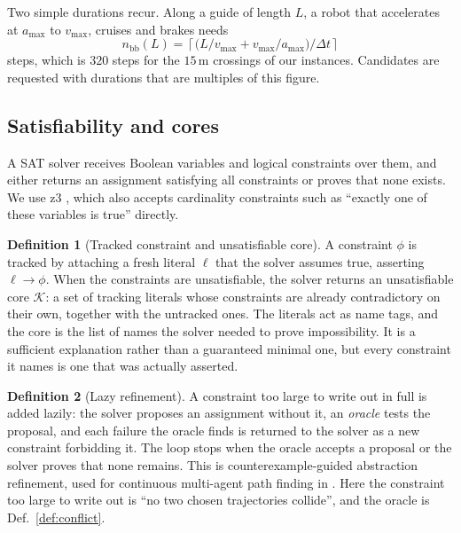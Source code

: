 \documentclass[conference]{IEEEtran}
\theoremstyle{plain}
\theoremstyle{definition}
\newtheorem{definition}{Definition}
\newcommand{\Core}{\mathcal{K}}
\begin{document}
Two simple durations recur. Along a guide of length $L$, a robot that accelerates at
$a_{\max}$ to $v_{\max}$, cruises and brakes needs
\begin{equation}
  n_{\text{bb}}(L) = \left\lceil \big(L/v_{\max} + v_{\max}/a_{\max}\big)/\Delta t \right\rceil
  \label{eq:nbb}
\end{equation}
steps, which is $320$ steps for the $15$\,m crossings of our instances. Candidates are
requested with durations that are multiples of this figure.

\subsection{Satisfiability and cores}
\label{sec:prelim-sat}

A SAT solver receives Boolean variables and logical constraints over them, and either returns
an assignment satisfying all constraints or proves that none exists. We use z3 \cite{z3},
which also accepts cardinality constraints such as ``exactly one of these variables is
true'' directly.

\begin{definition}[Tracked constraint and unsatisfiable core]
\label{def:core}
A constraint $\phi$ is tracked by attaching a fresh literal $\ell$ that the solver assumes
true, asserting $\ell \rightarrow \phi$. When the constraints are unsatisfiable, the solver
returns an unsatisfiable core $\Core$: a set of tracking literals whose constraints are
already contradictory on their own, together with the untracked ones. The literals act as
name tags, and the core is the list of names the solver needed to prove impossibility. It is
a sufficient explanation rather than a guaranteed minimal one, but every constraint it names
is one that was actually asserted.
\end{definition}

\begin{definition}[Lazy refinement]
\label{def:cegar}
A constraint too large to write out in full is added lazily: the solver proposes an
assignment without it, an \emph{oracle} tests the proposal, and each failure the oracle finds
is returned to the solver as a new constraint forbidding it. The loop stops when the oracle
accepts a proposal or the solver proves that none remains. This is counterexample-guided
abstraction refinement, used for continuous multi-agent path finding in \cite{surynek2020}.
Here the constraint too large to write out is ``no two chosen trajectories collide'', and the
oracle is Def.~\ref{def:conflict}.
\end{definition}
\end{document}
